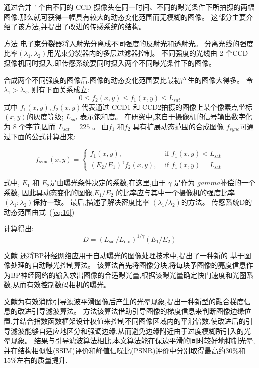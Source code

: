 \message{ !name(main.tex)}\documentclass{amsart}
\begin{document}
通过合并 ’ 个由不同的 CCD 摄像头在同一时间、不同的曝光条件下所拍摄的两幅图像,那么就可获得一幅具有较大的动态变化范围而无模糊的图像。
这部分主要介绍了该方法,并提出了改进的传感系统的结构。

方法 电子束分裂器将入射光分离成不同强度的反射光和透射光。
分离光线的强度比率$(\lambda_1,\lambda_2)$用光束分裂器内的多层过滤器控制。
不同强度的光线由 2 个CCD 摄像机同时摄入,即传感系统要同时摄入两个不同曝光条件下的图像。

合成两个不同强度的图像后,图像的动态变化范围要比最初产生的图像大得多。
令$\lambda_1>\lambda_2$,
则有下面关系成立:
\begin{equation}
  \label{eq:14}
0 \leq f_2(x,y) \leq f_1(x,y) \leq L_{sat}
\end{equation}
式中 $f_1(x,y),f_2(x,y)$代表通过 CCD1 和 CCD2拍摄的图像上某个像素点坐标$(x,y)$的灰度等级;
$ L_{sat}$ 表示饱和度。
在研究中,来自于摄像机的信号输出数字化为 8 个字节,因而 $ L_{sat}=225$ 。
由$f_1$ 和$f_2$ 具有扩展动态范围的合成图像 $f_{sync}$可通过下面的公式计算出来:

\begin{equation}
  \label{eq:15}
  f_{\mathrm{sync}}(x, y)=\left\{\begin{array}{cl}
f_{1}(x, y), & \text { if } f_{1}(x, y)<L_{\mathrm{sat}} \\
\left(E_{2} / E_{1}\right)^{\gamma} f_{2}(x, y), & \text { if } f_{1}(x, y)=L_{\mathrm{sat}}
\end{array}\right.
\end{equation}

式中, $E_1$ 和 $E_2$是由曝光条件决定的系数,在这里,由于 $\gamma$ 是作为 $gamma$补偿的一个系数,
因此具动态变化的图像,$E_1/E_2$ 的比率应与其中一个摄像机的强度比率
$(\lambda_1:\lambda_2 )$保持一致。
最后,描述了解决密度比率 $(\lambda_1/\lambda_2)$的方法。
传感系统D的动态范围由式~(\ref{eq:16})

计算得出:
\begin{equation}
  \label{eq:16}
D=\left(L_{\mathrm{sat}} / L_{\mathrm{noi}}\right)^{1 / \gamma}\left(E_{1} / E_{2}\right)
\end{equation}

文献 \cite{徐培风}还将BP神经网络应用于自动曝光的图像处理技术中,提出了一种新的
基于图像处理的自动曝光控制算法。
该算法首先将图像分块,将每块予图像的亮度信息作为BP神经网络的输入求出图像的合适曝光量,根据该曝光量确定快门速度和光圈系数,从而有效控制数码相机的曝光。


文献\cite{谢伟}为有效消除引导滤波平滑图像后产生的光晕现象,提出一种新型的融合梯度信息的改进引导滤波算法。
方法该算法借助引导图像的梯度信息来判断图像边缘位置,并结合指数函数框架设计权值来控制不同图像区域内的平滑倍数,使改进后的引导滤波能够自适应地区分和强调边缘,从而避免边缘附近由于过度模糊所引入的光晕现象。
结果与引导滤波算法相比,本文算法能在保边平滑的同时较好地抑制光晕,并在结构相似性(SSIM)评价和峰值信噪比(PSNR)评价中分别取得最高约$30\%$和$15\%$左右的质量提升.
\end{document}
